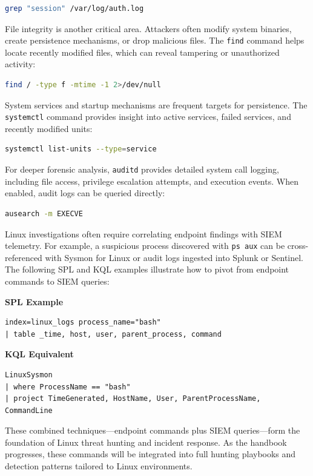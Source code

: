 \begin{lstlisting}[language=bash]
grep "session" /var/log/auth.log
\end{lstlisting}

File integrity is another critical area. Attackers often modify system binaries, create persistence mechanisms, or drop malicious files. 
The \texttt{find} command helps locate recently modified files, which can reveal tampering or unauthorized activity:

\begin{lstlisting}[language=bash]
find / -type f -mtime -1 2>/dev/null
\end{lstlisting}

System services and startup mechanisms are frequent targets for persistence. The \texttt{systemctl} command provides insight into 
active services, failed services, and recently modified units:

\begin{lstlisting}[language=bash]
systemctl list-units --type=service
\end{lstlisting}

For deeper forensic analysis, \texttt{auditd} provides detailed system call logging, including file access, privilege escalation attempts, 
and execution events. When enabled, audit logs can be queried directly:

\begin{lstlisting}[language=bash]
ausearch -m EXECVE
\end{lstlisting}

Linux investigations often require correlating endpoint findings with SIEM telemetry. For example, a suspicious process discovered
with \texttt{ps aux} can be cross-referenced with Sysmon for Linux or audit logs ingested into Splunk or Sentinel. 
The following SPL and KQL examples illustrate how to pivot from endpoint commands to SIEM queries:

\textbf{SPL Example}
\begin{lstlisting}
index=linux_logs process_name="bash"
| table _time, host, user, parent_process, command
\end{lstlisting}

\textbf{KQL Equivalent}
\begin{lstlisting}
LinuxSysmon
| where ProcessName == "bash"
| project TimeGenerated, HostName, User, ParentProcessName, CommandLine
\end{lstlisting}

These combined techniques—endpoint commands plus SIEM queries—form the foundation of Linux threat hunting and incident response. 
As the handbook progresses, these commands will be integrated into full hunting playbooks and detection patterns tailored to 
Linux environments.
